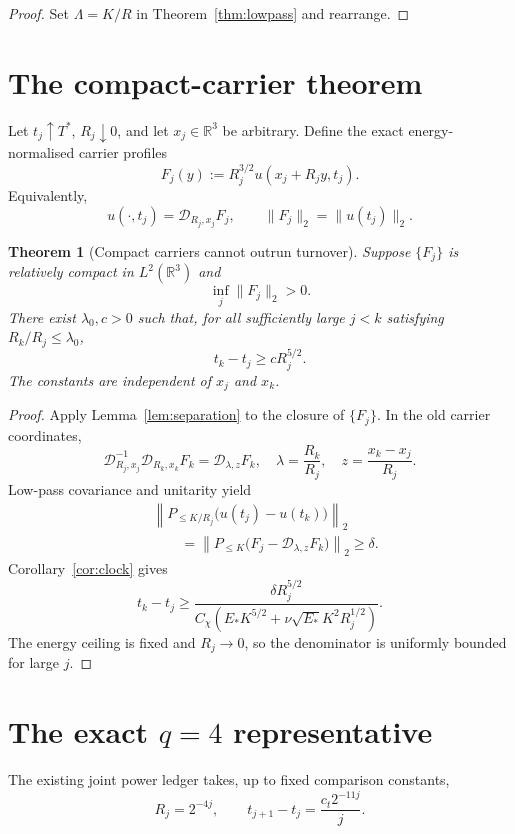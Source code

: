 \documentclass[11pt]{article}
\newtheorem{theorem}{Theorem}
\theoremstyle{remark}
\newcommand{\R}{\mathbb R}
\newcommand{\D}{\mathcal D}
\newcommand{\Plo}[1]{P_{\le #1}}
\begin{document}
\begin{proof}
Set \(\Lambda=K/R\) in Theorem~\ref{thm:lowpass} and rearrange.
\end{proof}

\section{The compact-carrier theorem}

Let \(t_j\uparrow T^*\), \(R_j\downarrow0\), and let \(x_j\in\R^3\) be
arbitrary.  Define the exact energy-normalised carrier profiles
\[
 F_j(y)
 :=
 R_j^{3/2}u(x_j+R_jy,t_j).
\]
Equivalently,
\[
 u(\cdot,t_j)=\D_{R_j,x_j}F_j,
 \qquad
 \|F_j\|_2=\|u(t_j)\|_2.
\]

\begin{theorem}[Compact carriers cannot outrun turnover]
\label{thm:carrier}
Suppose \(\{F_j\}\) is relatively compact in \(L^2(\R^3)\) and
\[
 \inf_j\|F_j\|_2>0.
\]
There exist \(\lambda_0,c>0\) such that, for all sufficiently large
\(j<k\) satisfying \(R_k/R_j\le\lambda_0\),
\[
 \boxed{t_k-t_j\ge cR_j^{5/2}.}
\]
The constants are independent of \(x_j\) and \(x_k\).
\end{theorem}

\begin{proof}
Apply Lemma~\ref{lem:separation} to the closure of \(\{F_j\}\).  In the old
carrier coordinates,
\[
 \D_{R_j,x_j}^{-1}\D_{R_k,x_k}F_k
 =
 \D_{\lambda,z}F_k,
 \quad
 \lambda=\frac{R_k}{R_j},
 \quad
 z=\frac{x_k-x_j}{R_j}.
\]
Low-pass covariance and unitarity yield
\[
\begin{aligned}
 &\left\|
 \Plo{K/R_j}\bigl(u(t_j)-u(t_k)\bigr)
 \right\|_2\\
 &\qquad=
 \left\|
 \Plo K\bigl(F_j-\D_{\lambda,z}F_k\bigr)
 \right\|_2
 \ge\delta.
\end{aligned}
\]
Corollary~\ref{cor:clock} gives
\[
 t_k-t_j
 \ge
 \frac{\delta R_j^{5/2}}
 {C_\chi\left(
 E_*K^{5/2}
 +
 \nu\sqrt{E_*}K^2R_j^{1/2}
 \right)}.
\]
The energy ceiling is fixed and \(R_j\to0\), so the denominator is uniformly
bounded for large \(j\).
\end{proof}

\section{The exact \texorpdfstring{\(q=4\)}{q=4} representative}

The existing joint power ledger takes, up to fixed comparison constants,
\[
 R_j=2^{-4j},
 \qquad
 t_{j+1}-t_j=\frac{c_t2^{-11j}}j.
\]
\end{document}
